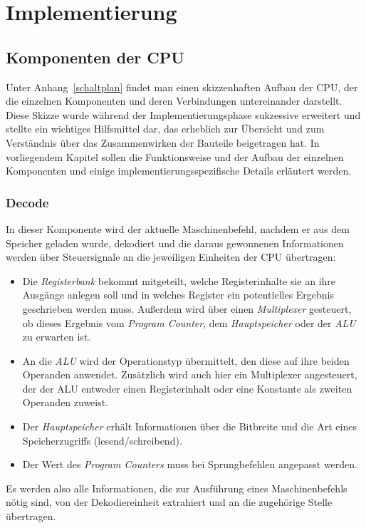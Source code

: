 \iffalse
Herausforderungen:
\TODO: ELF, 


Sonstiges:
\TODO: links zu Quellcode
\TODO: Warnings entfernen
\fi

\chapter{Implementierung} %
\label{Umsetzung} %

\section{Komponenten der CPU}
\label{sec:komponenten}

Unter Anhang~\ref{schaltplan} findet man einen skizzenhaften Aufbau der CPU, der die einzelnen Komponenten und deren Verbindungen untereinander darstellt.
Diese Skizze wurde während der Implementierungsphase sukzessive erweitert und stellte ein wichtiges Hilfsmittel dar, das erheblich zur Übersicht und zum Verständnis über das Zusammenwirken der Bauteile beigetragen hat.
In vorliegendem Kapitel sollen die Funktionsweise und der Aufbau der einzelnen Komponenten und einige implementierungsspezifische Details erläutert werden.

\subsection{Decode}

In dieser Komponente wird der aktuelle Maschinenbefehl, nachdem er aus dem Speicher geladen wurde, dekodiert und die daraus gewonnenen Informationen werden über Steuersignale an die jeweiligen Einheiten der CPU übertragen:
\begin{itemize}
    \item Die \textit{Registerbank} bekommt mitgeteilt, welche Registerinhalte sie an ihre Ausgänge anlegen soll und in welches Register ein potentielles Ergebnis geschrieben werden muss.
        Außerdem wird über einen \textit{Multiplexer} gesteuert, ob dieses Ergebnis vom \textit{Program Counter}, dem \textit{Hauptspeicher} oder der \textit{ALU} zu erwarten ist.
    \item An die \textit{ALU} wird der Operationstyp übermittelt, den diese auf ihre beiden Operanden anwendet.
        Zusätzlich wird auch hier ein Multiplexer angesteuert, der der ALU entweder einen Registerinhalt oder eine Konstante als zweiten Operanden zuweist.
    \item Der \textit{Hauptspeicher} erhält Informationen über die Bitbreite und die Art eines Speicherzugriffs (lesend/schreibend).
    \item Der Wert des \textit{Program Counters} muss bei Sprungbefehlen angepasst werden.
\end{itemize}
Es werden also alle Informationen, die zur Ausführung eines Maschinenbefehls nötig sind, von der Dekodiereinheit extrahiert und an die zugehörige Stelle übertragen. 


